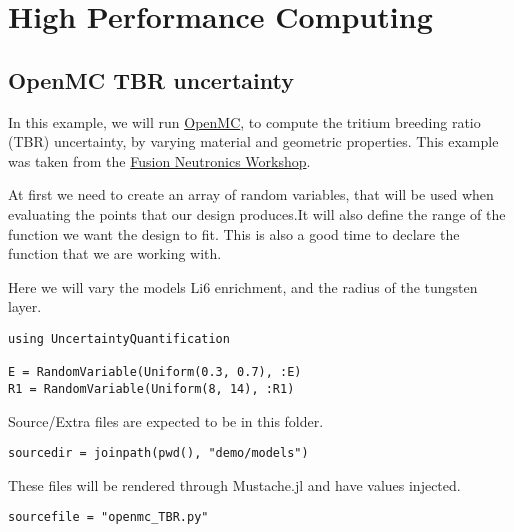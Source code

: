 \section{High Performance Computing}



\label{957858869020788811}{}


\subsection{OpenMC TBR uncertainty}



\label{3995829456779924398}{}


In this example, we will run \href{https://openmc.org/}{OpenMC}, to compute the tritium breeding ratio (TBR) uncertainty, by varying material and geometric properties. This example was taken from the \href{https://github.com/fusion-energy/neutronics-workshop}{Fusion Neutronics Workshop}.



At first we need to create an array of random variables, that will be used when evaluating the points that our design produces.It will also define the range of the function we want the design to fit. This is also a good time to declare the function that we are working with.



Here we will vary the model{\textquotesingle}s Li6 enrichment, and the radius of the tungsten layer.




\begin{verbatim}
using UncertaintyQuantification

E = RandomVariable(Uniform(0.3, 0.7), :E)
R1 = RandomVariable(Uniform(8, 14), :R1)
\end{verbatim}



Source/Extra files are expected to be in this folder.




\begin{verbatim}
sourcedir = joinpath(pwd(), "demo/models")
\end{verbatim}



These files will be rendered through Mustache.jl and have values injected.




\begin{verbatim}
sourcefile = "openmc_TBR.py"
\end{verbatim}



